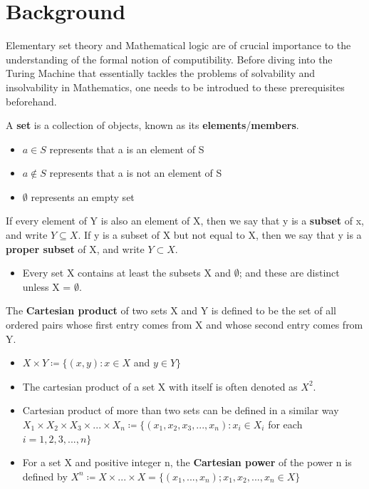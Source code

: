 \documentclass{article}
\begin{document}
\section{Background}
Elementary set theory and Mathematical logic are of crucial importance to the understanding of the formal notion of computibility. Before diving into the Turing Machine that essentially tackles the problems of solvability and insolvability in Mathematics, one needs to be introdued to these prerequisites beforehand.
\begin{defin}
A \textbf{set} is a collection of objects, known as its \textbf{elements}/\textbf{members}.
\begin{itemize}
\item $a\in S$ represents that a is an element of S
\item $a \notin S$ represents that a is not an element of S
\item $\emptyset$ represents an empty set
\end{itemize}
\end{defin}
\begin{defin}
If every element of Y is also an element of X, then we say that y is a \textbf{subset} of x, and write $Y\subseteq X$.
If y is a subset of X but not equal to X, then we say that y is a \textbf{proper subset} of X, and write $Y\subset X$.
\begin{itemize}
\item Every set X contains at least the subsets X and $\emptyset$; and these are distinct unless X = $\emptyset$.
\end{itemize}
\end{defin}
\begin{defin}
The \textbf{Cartesian product} of two sets X and Y is defined to be the set of all ordered pairs whose first entry comes from X and whose second entry comes from Y.
\begin{itemize}
\item $X \times Y \coloneq \{ (x, y): x \in X$ and $y \in Y \}$
\item The cartesian product of a set X with itself is often denoted as $X^{2}$.
\item Cartesian product of more than two sets can be defined in a similar way
$X_{1}\times X_{2}\times X_{3} \times {...} \times X_{n} \coloneq \{( x_{1},x_{2},x_{3},{...},x_{n}):x_{i}\in X_{i}$ for each $i = 1,2,3,{...},n\}$
\item For a set X and positive integer n, the \textbf{Cartesian power} of the power n is defined by
$X^{n} \coloneq X \times {...} \times X = \{(x_{1},{...},x_n) ; x_{1},x_{2},{...},x_{n}\in X\}$
\end{itemize}
\end{defin}
\end{document}
